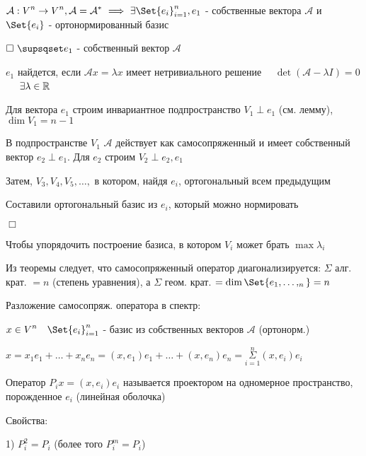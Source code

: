 \documentclass[12pt]{article}
\begin{document}
    \Th $\displaystyle \mathcal{A}: V^n \to V^n, \mathcal{A} = \mathcal{A}^* \ \Longrightarrow \ \exists \Set{e_i}^n_{i=1}, e_1$ -
    собственные вектора $\mathcal{A}$ и $\displaystyle \Set{e_i}$ - ортонормированный базис

    $\displaystyle \Box \ \supsqset e_1$ - собственный вектор $\mathcal{A}$

    $\displaystyle e_1$ найдется, если $\mathcal{A}x = \lambda x$ имеет нетривиального решение \ \Longleftrightarrow \
    $\det(\mathcal{A} - \lambda I) = 0$ \  \ $\exists \lambda \in \mathbb{R}$

    Для вектора $\displaystyle e_1$ строим инвариантное подпространство $\displaystyle V_1 \perp e_1$ (см. лемму), $\displaystyle \dim V_1 = n - 1$

    В подпространстве $\displaystyle V_1$ $\mathcal{A}$ действует как самосопряженный и имеет собственный вектор $\displaystyle e_2 \perp e_1$.
    Для $\displaystyle e_2$ строим $\displaystyle V_2 \perp e_2, e_1$

    Затем, $\displaystyle V_3, V_4, V_5, \dots,$ в котором, найдя $\displaystyle e_i$, ортогональный всем предыдущим

    Составили ортогональный базис из $\displaystyle e_i$, который можно нормировать

    $\Box$

    \Nota Чтобы упорядочить построение базиса, в котором $\displaystyle V_i$ может брать $\displaystyle \max \lambda_i$

    \Nota Из теоремы следует, что самосопряженный оператор диагонализируется: $\displaystyle \Sigma$ алг. крат. $ = n$ (степень уравнения), а $\displaystyle \Sigma$ геом. крат. $\displaystyle = \dim \Set{e_1, \dots, _n} = n$


    Разложение самосопряж. оператора в спектр:

    $\displaystyle x \in V^n \quad \Set{e_i}_{i=1}^n$ - базис из собственных векторов $\mathcal{A}$ (ортонорм.)

    $\displaystyle x = x_1 e_1 + \dots + x_n e_n = (x, e_1) e_1 + \dots + (x, e_n) e_n = \overset{n}{\underset{i = 1}{\Sigma}} (x, e_i) e_i$

    \Def Оператор $\displaystyle P_i x = (x, e_i) e_i$ называется проектором на одномерное пространство, порожденное $\displaystyle e_i$ (линейная оболочка)

    Свойства:

    1) $\displaystyle P_i^2 = P_i$ (более того $\displaystyle P^m_i = P_i$)
\end{document}
